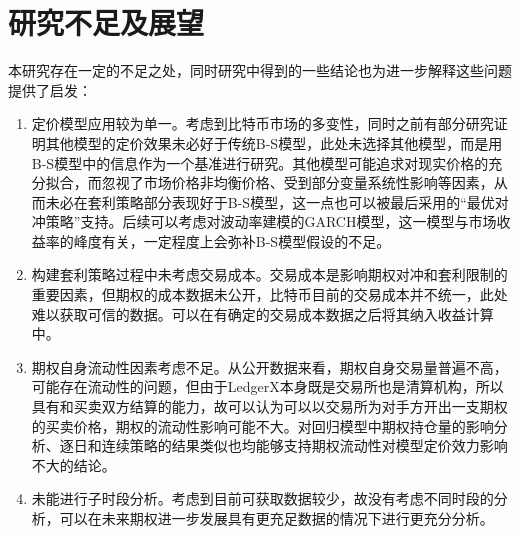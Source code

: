 \section{研究不足及展望} 
本研究存在一定的不足之处，同时研究中得到的一些结论也为进一步解释这些问题提供了启发：
\begin{enumerate}[(1)]
    \item 定价模型应用较为单一。考虑到比特币市场的多变性，同时之前有部分研究证明其他模型的定价效果未必好于传统B-S模型，此处未选择其他模型，而是用B-S模型中的信息作为一个基准进行研究。其他模型可能追求对现实价格的充分拟合，而忽视了市场价格非均衡价格、受到部分变量系统性影响等因素，从而未必在套利策略部分表现好于B-S模型，这一点也可以被最后采用的“最优对冲策略”支持。后续可以考虑对波动率建模的GARCH模型，这一模型与市场收益率的峰度有关，一定程度上会弥补B-S模型假设的不足。
    \item 构建套利策略过程中未考虑交易成本。交易成本是影响期权对冲和套利限制的重要因素，但期权的成本数据未公开，比特币目前的交易成本并不统一，此处难以获取可信的数据。可以在有确定的交易成本数据之后将其纳入收益计算中。
    \item 期权自身流动性因素考虑不足。从公开数据来看，期权自身交易量普遍不高，可能存在流动性的问题，但由于LedgerX本身既是交易所也是清算机构，所以具有和买卖双方结算的能力，故可以认为可以以交易所为对手方开出一支期权的买卖价格，期权的流动性影响可能不大。对回归模型中期权持仓量的影响分析、逐日和连续策略的结果类似也均能够支持期权流动性对模型定价效力影响不大的结论。
    \item 未能进行子时段分析。考虑到目前可获取数据较少，故没有考虑不同时段的分析，可以在未来期权进一步发展具有更充足数据的情况下进行更充分分析。
\end{enumerate}
